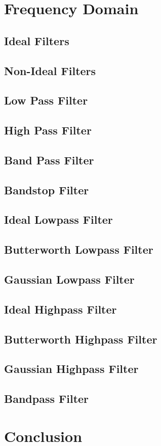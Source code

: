 \documentclass[letterpaper,12pt]{article}
\begin{document}
\section{Frequency Domain}
\subsection{Ideal Filters}
\subsection{Non-Ideal Filters}
\subsection{Low Pass Filter}
\subsection{High Pass Filter}
\subsection{Band Pass Filter}
\subsection{Bandstop Filter}


\subsection{Ideal Lowpass Filter}
\subsection{Butterworth Lowpass Filter}
\subsection{Gaussian Lowpass Filter}
\subsection{Ideal Highpass Filter}
\subsection{Butterworth Highpass Filter}
\subsection{Gaussian Highpass Filter}
\subsection{Bandpass Filter}
	
\section{Conclusion}
\end{document}
